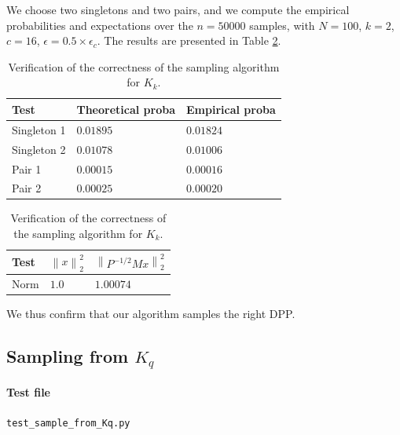 \documentclass{article}
\newcommand{\norm}[1]{\left\|#1\right\|}
\begin{document}
We choose two singletons and two pairs, and we compute the empirical probabilities and expectations over the $n=50000$ samples, with $N=100$, $k=2$, $c=16$, $\epsilon = 0.5 \times \epsilon_c$. The results are presented in Table \ref{tab:Kk:verification}.


\begin{table}[th]
  \caption{Verification of the correctness of the sampling algorithm for $K_k$.}
  \label{tab:Kk:verification}
  \centering
  \begin{tabular}{lll}
    \toprule
    Test &  Theoretical proba & Empirical proba \\
    \midrule
    Singleton 1 & $0.01895$ & $0.01824$ \\
    Singleton 2 & $0.01078$ & $0.01006$ \\
    Pair 1 & $0.00015$ & $0.00016$ \\
		Pair 2 & $0.00025$ & $0.00020$ \\
    \bottomrule
  \end{tabular}
	\quad
	\begin{tabular}{lll}
    \toprule
    Test &  $\norm{x}_2^2$ & $\norm{P^{-1/2} M x}_2^2$ \\
    \midrule
    Norm & $1.0$ & $1.00074$ \\
    \bottomrule
  \end{tabular}
\end{table}



We thus confirm that our algorithm samples the right DPP.


\subsection[Sampling from Kq]{Sampling from $K_q$}


\paragraph{Test file} \verb#test_sample_from_Kq.py#
\end{document}

